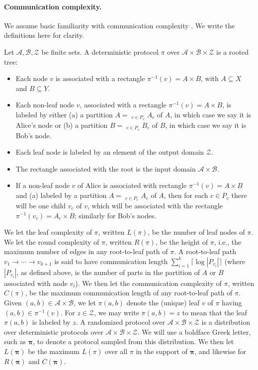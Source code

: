 \paragraph{Communication complexity.} We assume basic familiarity with communication complexity \cite{ref38}. We write the definitions here for clarity.
\setcounter{theorem}{4}
\begin{definition}[Protocol]\label{def:protocol}
Let $\mathcal A,\mathcal B,\mathcal Z$ be finite sets. A deterministic protocol $\pi$ over $\mathcal A\times\mathcal B\times\mathcal Z$ is a rooted tree:
\begin{itemize}
\item Each node $v$ is associated with a rectangle $\pi^{-1}(v)=A\times B$, with $A\subseteq X$ and $B\subseteq Y$.
\item Each non-leaf node $v$, associated with a rectangle $\pi^{-1}(v)=A\times B$, is labeled by either (a) a partition $A=\mathop{\dot\bigcup}_{c\in P_v} A_c$ of $A$, in which case we say it is Alice's node or (b) a partition $B=\mathop{\dot\bigcup}_{c\in P_v} B_c$ of $B$, in which case we say it is Bob's node.
\item Each leaf node is labeled by an element of the output domain $\mathcal Z$.
\item The rectangle associated with the root is the input domain $\mathcal A\times\mathcal B$.
\item If a non-leaf node $v$ of Alice is associated with rectangle $\pi^{-1}(v)=A\times B$ and (a) labeled by a partition $A=\mathop{\dot\bigcup}_{c\in P_v} A_c$ of $A$, then for each $c\in P_v$ there will be one child $v_c$ of $v$, which will be associated with the rectangle $\pi^{-1}(v_c)=A_c\times B$; similarly for Bob's nodes.
\end{itemize}
We let the leaf complexity of $\pi$, written $L(\pi)$, be the number of leaf nodes of $\pi$. We let the round complexity of $\pi$, written $R(\pi)$, be the height of $\pi$, i.e., the maximum number of edges in any root-to-leaf path of $\pi$.
A root-to-leaf path $v_1\to\cdots\to v_{k+1}$ is said to have communication length $\sum_{i=1}^k\lceil\log|P_{v_i}|\rceil$ (where $|P_{v_i}|$, as defined above, is the number of parts in the partition of $A$ or $B$ associated with node $v_i$). We then let the communication complexity of $\pi$, written $C(\pi)$, be the maximum communication length of any root-to-leaf path of $\pi$.
Given $(a,b)\in\mathcal A\times\mathcal B$, we let $\pi(a,b)$ denote the (unique) leaf $v$ of $\pi$ having $(a,b)\in\pi^{-1}(v)$. For $z\in\mathcal Z$, we may write $\pi(a,b)=z$ to mean that the leaf $\pi(a,b)$ is labeled by $z$.
A randomized protocol over $\mathcal A\times\mathcal B\times\mathcal Z$ is a distribution over deterministic protocols over $\mathcal A\times\mathcal B\times\mathcal Z$. We will use a boldface Greek letter, such as $\boldsymbol\pi$, to denote a protocol sampled from this distribution. We then let $L(\boldsymbol\pi)$ be the maximum $L(\pi)$ over all $\pi$ in the support of $\boldsymbol\pi$, and likewise for $R(\boldsymbol\pi)$ and $C(\boldsymbol\pi)$.
\end{definition}
